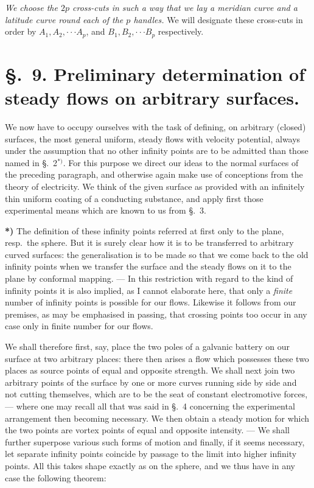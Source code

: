 \documentclass{article}
\begin{document}
\emph{We choose the $2p$ cross-cuts in such a way that we lay a meridian curve and a latitude curve round each of the $p$ handles.} We will designate these cross-cuts in order by $A_{1}, A_{2}, \cdot\cdot\cdot A_{p}$, and $B_{1}, B_{2}, \cdot\cdot\cdot B_{p}$ respectively.

\section*{§.~9. Preliminary determination of steady flows on arbitrary surfaces.}

We now have to occupy ourselves with the task of defining, on arbitrary (closed) surfaces, the most general uniform, steady flows with velocity potential, always under the assumption that no other infinity points are to be admitted than those named in §.~2${}^{*)}$. For this purpose we direct our ideas to the normal surfaces of the preceding paragraph, and otherwise again make use of conceptions from the theory of electricity. We think of the given surface as provided with an infinitely thin uniform coating of a conducting substance, and apply first those experimental means which are known to us from §.~3.

\textbf{*)} The definition of these infinity points referred at first only to the plane, resp.\ the sphere. But it is surely clear how it is to be transferred to arbitrary curved surfaces: the generalisation is to be made so that we come back to the old infinity points when we transfer the surface and the steady flows on it to the plane by conformal mapping. --- In this restriction with regard to the kind of infinity points it is also implied, as I cannot elaborate here, that only a \emph{finite} number of infinity points is possible for our flows. Likewise it follows from our premises, as may be emphasised in passing, that crossing points too occur in any case only in finite number for our flows.


We shall therefore first, say, place the two poles of a galvanic battery on our surface at two arbitrary places: there then arises a flow which possesses these two places as source points of equal and opposite strength. We shall next join two arbitrary points of the surface by one or more curves running side by side and not cutting themselves, which are to be the seat of constant electromotive forces, --- where one may recall all that was said in §.~4 concerning the experimental arrangement then becoming necessary. We then obtain a steady motion for which the two points are vortex points of equal and opposite intensity. --- We shall further superpose various such forms of motion and finally, if it seems necessary, let separate infinity points coincide by passage to the limit into higher infinity points. All this takes shape exactly as on the sphere, and we thus have in any case the following theorem:
\end{document}
